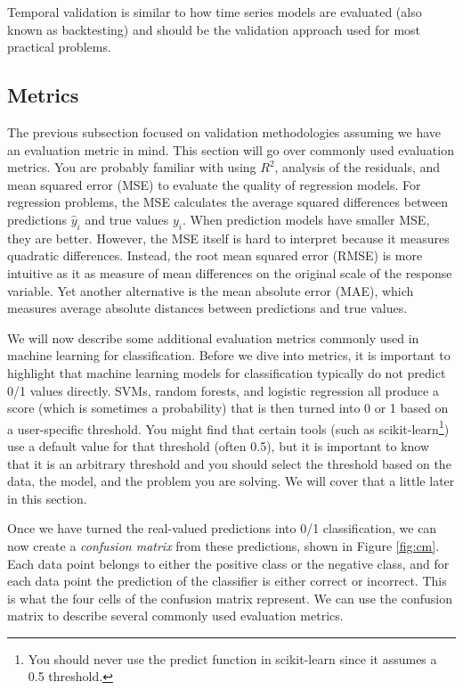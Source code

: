 \documentclass[]{krantz}
\begin{document}
Temporal validation is similar to how time series models are evaluated
(also known as backtesting) and should be the validation approach used
for most practical problems.

\subsection{Metrics}\label{sec:7-7.2}

The previous subsection focused on validation methodologies assuming we
have an evaluation metric in mind. This section will go over commonly
used evaluation metrics. You are probably familiar with using \(R^2\),
analysis of the residuals, and mean squared error (MSE) to evaluate the
quality of regression models. For regression problems, the MSE
calculates the average squared differences between predictions
\(\hat{y}_i\) and true values \(y_i\). When prediction models have
smaller MSE, they are better. However, the MSE itself is hard to
interpret because it measures quadratic differences. Instead, the root
mean squared error (RMSE) is more intuitive as it as measure of mean
differences on the original scale of the response variable. Yet another
alternative is the mean absolute error (MAE), which measures average
absolute distances between predictions and true values.

We will now describe some additional evaluation metrics commonly used in
machine learning for classification. Before we dive into metrics, it is
important to highlight that machine learning models for classification
typically do not predict 0/1 values directly. SVMs, random forests, and
logistic regression all produce a score (which is sometimes a
probability) that is then turned into 0 or 1 based on a user-specific
threshold. You might find that certain tools (such as
scikit-learn\footnote{You should never use the predict function in
  scikit-learn since it assumes a 0.5 threshold.}) use a default value
for that threshold (often 0.5), but it is important to know that it is
an arbitrary threshold and you should select the threshold based on the
data, the model, and the problem you are solving. We will cover that a
little later in this section.

Once we have turned the real-valued predictions into 0/1 classification,
we can now create a \emph{confusion matrix} from these predictions,
shown in Figure \ref{fig:cm}. Each data point belongs to either the
positive class or the negative class, and for each data point the
prediction of the classifier is either correct or incorrect. This is
what the four cells of the confusion matrix represent. We can use the
confusion matrix to describe several commonly used evaluation metrics.
\end{document}

